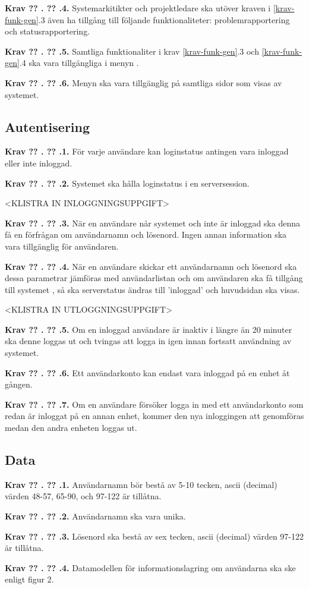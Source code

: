 \documentclass[a4paper]{article}
\newcommand\getcurrentref[1]{%
 \ifnumequal{\value{#1}}{0}
  {??}
  {\the\value{#1}}%
}
\newcommand\requirement[2]{
	\numberedrow{Krav}{#1}{#2}
}
\newcommand\numberedrow[3]{
	\noindent
	\textbf{#1 \getcurrentref{section}.\getcurrentref{subsection}.#2.} #3
	
}
\begin{document}
\requirement{4}{Systemarkitikter och projektledare ska utöver kraven i \ref{krav-funk-gen}.3 även ha tillgång till följande funktionaliteter: problemrapportering och statusrapportering.}
\requirement{5}{Samtliga funktionaliter i krav \ref{krav-funk-gen}.3 och \ref{krav-funk-gen}.4 ska vara tillgängliga i menyn .}
\requirement{6}{Menyn ska vara tillgänglig på samtliga sidor som visas av systemet. }
 
\subsection{Autentisering}
\requirement{1}{För varje användare kan loginstatus antingen vara inloggad eller inte inloggad.}
\requirement{2}{Systemet ska hålla loginstatus i en serversession.}
<KLISTRA IN INLOGGNINGSUPPGIFT>
\requirement{3}{När en användare når systemet och inte är inloggad ska denna få en förfrågan om användarnamn och lösenord. Ingen annan information ska vara tillgänglig för användaren.}
\requirement{4}{När en användare skickar ett användarnamn och lösenord ska dessa parametrar jämföras med användarlistan och om användaren ska få tillgång till systemet , så ska serverstatus ändras till 'inloggad' och huvudsidan ska visas.}
<KLISTRA IN UTLOGGNINGSUPPGIFT>
\requirement{5}{Om en inloggad användare är inaktiv i längre än 20 minuter ska denne loggas ut och tvingas att logga in igen innan fortsatt användning av systemet.}
\requirement{6}{Ett användarkonto kan endast vara inloggad på en enhet åt gången.}
\requirement{7}{Om en användare försöker logga in med ett användarkonto som redan är inloggat på en annan enhet, kommer den nya inloggingen att genomföras medan den andra enheten loggas ut.}

\subsection{Data}
\label{krav-funk-data}
\requirement{1}{Användarnamn bör bestå av 5-10 tecken, ascii (decimal) värden 48-57, 65-90, och 97-122 är tillåtna.}
\requirement{2}{Användarnamn ska vara unika.}
\requirement{3}{Lösenord ska bestå av sex tecken, ascii (decimal) värden 97-122 är tillåtna.}

\requirement{4}{Datamodellen för informationslagring om användarna ska ske enligt figur 2.
}
\end{document}
